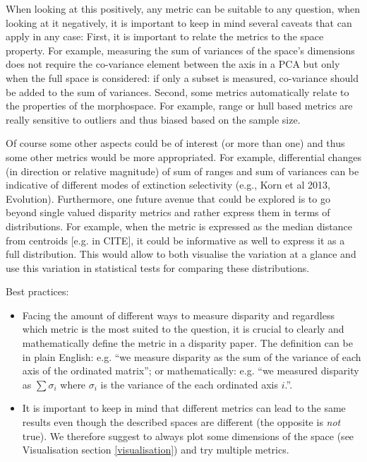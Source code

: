 \documentclass[12pt,letterpaper]{article}
\begin{document}
When looking at this positively, any metric can be suitable to any question, when looking at it negatively, it is important to keep in mind several caveats that can apply in any case:
First, it is important to relate the metrics to the space property.
For example, measuring the sum of variances of the space's dimensions does not require the co-variance element between the axis in a PCA but only when the full space is considered: if only a subset is measured, co-variance should be added to the sum of variances.
Second, some metrics automatically relate to the properties of the morphospace.
For example, range or hull based metrics are really sensitive to outliers and thus biased based on the sample size.

Of course some other aspects could be of interest (or more than one) and thus some other metrics would be more appropriated.
For example, differential changes (in direction or relative magnitude) of sum of ranges and sum of variances can be indicative of different modes of extinction selectivity (e.g., Korn et al 2013, Evolution).
Furthermore, one future avenue that could be explored is to go beyond single valued disparity metrics and rather express them in terms of distributions.
For example, when the metric is expressed as the median distance from centroids [e.g. in CITE], it could be informative as well to express it as a full distribution.
This would allow to both visualise the variation at a glance and use this variation in statistical tests for comparing these distributions.

Best practices:
\begin{itemize}
\item Facing the amount of different ways to measure disparity and regardless which metric is the most suited to the question, it is crucial to clearly and mathematically define the metric in a disparity paper. The definition can be in plain English: e.g. ``we measure disparity as the sum of the variance of each axis of the ordinated matrix''; or mathematically: e.g. ``we measured disparity as $\sum\sigma_i$ where $\sigma_i$ is the variance of the each ordinated axis $i$.''.
\item It is important to keep in mind that different metrics can lead to the same results even though the described spaces are different (the opposite is \textit{not} true). We therefore suggest to always plot some dimensions of the space (see Visualisation section \ref{visualisation}) and try multiple metrics.
\end{itemize}
\end{document}
